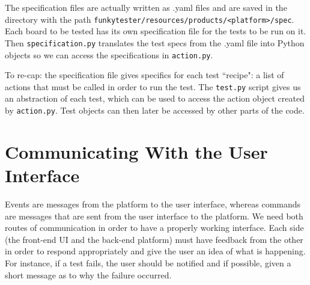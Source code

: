 \documentclass{report}
\begin{document}
The specification files are actually written as .yaml files and are saved in the directory with the path \texttt{funkytester/resources/products/<platform>/spec}. Each board to be tested has its own specification file for the tests to be run on it. Then  \texttt{specification.py} translates the test specs from the .yaml file into Python objects so we can access the specifications in \texttt{action.py}.

To re-cap: the specification file gives specifics for each test ``recipe": a list of actions that must be called in order to run the test. The \texttt{test.py} script gives us an abstraction of each test, which can be used to access the action object created by \texttt{action.py}. Test objects can then later be accessed by other parts of the code.\\

	\begin{minipage}{\linewidth}
		\label{fig:test}
	\end{minipage}
	\vspace{5pt}		%

\section{Communicating With the User Interface}
Events are messages from the platform to the user interface, whereas commands are messages that are sent from the user interface to the platform. We need both routes of communication in order to have a properly working interface. Each side (the front-end UI and the back-end platform) must have feedback from the other in order to respond appropriately and give the user an idea of what is happening. For instance, if a test fails, the user should be notified and if possible, given a short message as to why the failure occurred.\\
\end{document}
